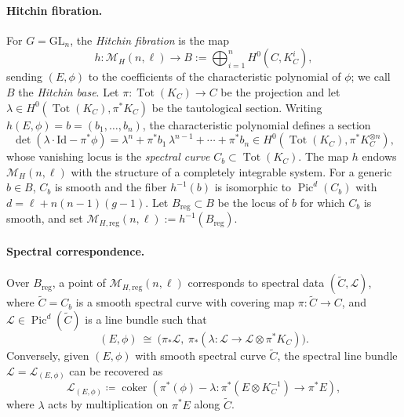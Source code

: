 \documentclass[twoside, 11pt]{article}
\numberwithin{equation}{section}
\theoremstyle{theorem}
\numberwithin{theorem}{section}
\theoremstyle{definition}
\begin{document}
%
\paragraph{Hitchin fibration.}

For $G=\mathrm{GL}_n$, the \emph{Hitchin fibration} is the map
\begin{equation}\label{e: hitchin fibration}
h:\mathcal{M}_H(n,\ell)\longrightarrow B:=\bigoplus_{i=1}^n H^0\!\left(C,K_C^i\right),
\end{equation}
sending $(E,\phi)$ to the coefficients of the characteristic polynomial of $\phi$; we call $B$ the \emph{Hitchin base}. Let $\pi:\operatorname{Tot}(K_C)\to C$ be the projection and let $\lambda\in H^0(\operatorname{Tot}(K_C),\pi^\ast K_C)$ be the tautological section. Writing $h(E,\phi)=b=(b_1,\dots,b_n)$, the characteristic polynomial defines a section
\[
\det\!\left(\lambda\cdot \mathrm{Id}-\pi^\ast\phi\right)
=
\lambda^n+\pi^\ast b_1\,\lambda^{n-1}+\cdots+\pi^\ast b_n
\in
H^0\!\left(\operatorname{Tot}(K_C),\pi^\ast K_C^{\otimes n}\right),
\]
whose vanishing locus is the \emph{spectral curve} $C_b\subset \operatorname{Tot}(K_C)$. The map $h$ endows $\mathcal{M}_H(n,\ell)$ with the structure of a completely integrable system. For a generic $b\in B$, $C_b$ is smooth and the fiber $h^{-1}(b)$ is isomorphic to $\operatorname{Pic}^{d}(C_b)$ with $d=\ell+n(n-1)(g-1)$. Let $B_{\mathrm{reg}}\subset B$ be the locus of $b$ for which $C_b$ is smooth, and set $\mathcal{M}_{H,\mathrm{reg}}(n,\ell):=h^{-1}(B_{\mathrm{reg}})$.

\paragraph{Spectral correspondence.}
Over $B_{\mathrm{reg}}$, a point of $\mathcal{M}_{H,\mathrm{reg}}(n,\ell)$ corresponds to spectral data $(\widetilde{C},\mathcal{L})$, where $\widetilde{C}=C_b$ is a smooth spectral curve with covering map $\pi:\widetilde{C}\to C$, and $\mathcal{L}\in \operatorname{Pic}^{d}(\widetilde{C})$ is a line bundle such that
\[
(E,\phi)\ \cong\ \bigl(\pi_\ast \mathcal{L},\ \pi_\ast(\lambda:\mathcal{L}\to \mathcal{L}\otimes \pi^\ast K_C)\bigr).
\]
Conversely, given $(E,\phi)$ with smooth spectral curve $\widetilde{C}$, the spectral line bundle $\mathcal{L}=\mathcal{L}_{(E,\phi)}$ can be recovered as
\[
\mathcal{L}_{(E,\phi)}
\coloneqq
\operatorname{coker}\!\left(
\pi^\ast(\phi)-\lambda:
\pi^\ast\!\left(E\otimes K_C^{-1}\right)\longrightarrow \pi^\ast E
\right),
\]
where $\lambda$ acts by multiplication on $\pi^\ast E$ along $\widetilde{C}$.
\end{document}
